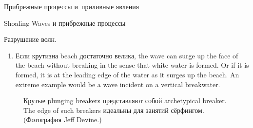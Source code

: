 \begin{chapter}{Прибрежные процессы и~приливные явления}
\begin{section}{Shoaling Waves и прибрежные процессы}
\begin{paragraph}{Разрушение волн.}
\begin{enumerate}
\item
Если крутизна beach достаточно велика, the wave can
surge up the face of the beach without
breaking in the sense that white water is formed. Or if it is formed,
it is at the leading edge of the water as it surges up the beach. An
extreme example would be a wave incident on a vertical breakwater.
%
\end{enumerate}
\end{paragraph}

\begin{figure}[t!]
\caption{Крутые plunging breakers представляют
собой archetypical breaker. The edge of such breakers идеальны для занятий
сёрфингом. (Фотография Jeff Devine.)}
\label{fig:wavecropped}
\end{figure}
%
%


\end{section}
\end{chapter}
